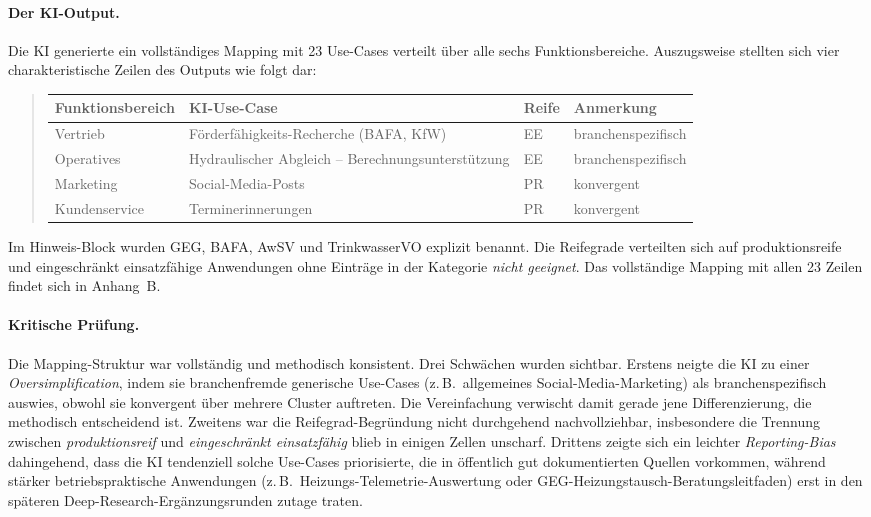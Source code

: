\documentclass[a4paper,11pt]{article}
\begin{document}
\paragraph{Der KI-Output.}
Die KI generierte ein vollständiges Mapping mit 23 Use-Cases verteilt
über alle sechs Funktionsbereiche. Auszugsweise stellten sich vier
charakteristische Zeilen des Outputs wie folgt dar:

\begin{quote}\small
\begin{tabular}{p{2.6cm}p{6.2cm}p{0.8cm}p{2.6cm}}
\toprule
\textbf{Funktionsbereich} & \textbf{KI-Use-Case} & \textbf{Reife} & \textbf{Anmerkung} \\
\midrule
Vertrieb & Förderfähigkeits-Recherche (BAFA, KfW) & EE & branchenspezifisch \\
Operatives & Hydraulischer Abgleich -- Berechnungsunterstützung & EE & branchenspezifisch \\
Marketing & Social-Media-Posts & PR & konvergent \\
Kundenservice & Terminerinnerungen & PR & konvergent \\
\bottomrule
\end{tabular}
\end{quote}

Im Hinweis-Block wurden GEG, BAFA, AwSV und Trinkwasser\-VO explizit
benannt. Die Reife\-grade verteilten sich auf produktionsreife und
eingeschränkt einsatzfähige Anwendungen ohne Einträge in der Kategorie
\emph{nicht geeignet}. Das vollständige Mapping mit allen 23 Zeilen
findet sich in Anhang~B.

\paragraph{Kritische Prüfung.}
Die Mapping-Struktur war vollständig und methodisch konsistent. Drei
Schwächen wurden sichtbar. Erstens neigte die KI zu einer
\emph{Oversimplification}, indem sie branchen\-fremde generische
Use-Cases (z.\,B.\ allgemeines Social-Media-Marketing) als
branchen\-spezifisch auswies, obwohl sie konvergent über mehrere
Cluster auftreten. Die Vereinfachung verwischt damit gerade jene
Differenzierung, die methodisch entscheidend ist. Zweitens war die
Reife\-grad-Begründung nicht durchgehend nachvollziehbar, insbesondere
die Trennung zwischen \emph{produktionsreif} und \emph{eingeschränkt
einsatzfähig} blieb in einigen Zellen unscharf. Drittens zeigte sich
ein leichter \emph{Reporting-Bias} dahingehend, dass die KI tendenziell
solche Use-Cases priorisierte, die in öffentlich gut dokumentierten
Quellen vorkommen, während stärker betriebs\-praktische Anwendungen
(z.\,B.\ Heizungs-Telemetrie-Auswertung oder GEG-Heizungs\-tausch-Beratungs\-leitfaden)
erst in den späteren Deep-Research-Ergänzungs\-runden zutage traten.
\end{document}
